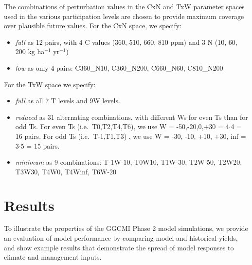 \documentclass[gmd, manuscript]{copernicus} %
\begin{document}
The combinations of perturbation values in the CxN and TxW parameter spaces used in the various participation levels are chosen to provide maximum coverage over plausible future values. For the CxN space, we specify:
\begin{itemize}
  \item \textit{full} as 12 pairs, with 4 C values (360, 510, 660, 810 ppm) and 3 N (10, 60, 200 kg ha$^{-1}$ yr$^{-1}$)
  \item \textit{low} as only 4 pairs: C360\_N10, C360\_N200, C660\_N60, C810\_N200
\end{itemize}
    
For the TxW space we specify:
\begin{itemize}
  \item \textit{full} as all 7 T levels and 9W levels.
  \item \textit{reduced} as 31 alternating combinations, with different Ws for even Ts than for odd Ts. For even Ts (i.e.\ T0,T2,T4,T6), we use W = -50,-20,0,+30 = 4$\cdot$4 = 16 pairs. For odd Ts (i.e.\ T-1,T1,T3) , we use W = -30, -10, +10, +30, inf = 3$\cdot$5 = 15 pairs.
  \item \textit{minimum} as 9 combinations: T-1W-10, T0W10, T1W-30, T2W-50, T2W20, T3W30, T4W0, T4Winf, T6W-20
\end{itemize}


\section{Results}
\label{S:4}

To illustrate the properties of the GGCMI Phase 2 model simulations, we provide an evaluation of model performance by comparing model and historical yields, and show example results that demonstrate the spread of model responses to climate and management inputs. 
\end{document}
